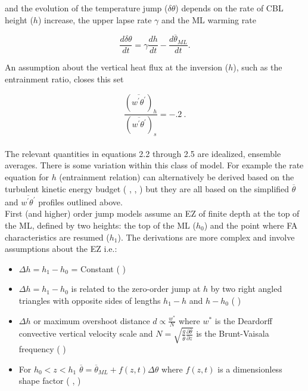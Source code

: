 and the evolution of the temperature jump ($\delta \theta$) depends on the rate of \acs{CBL} height ($h$) increase, the upper lapse rate $\gamma$ and the \acs{ML} warming rate
  
\begin{equation}
\frac{d\delta \theta}{dt} = \gamma\frac{dh}{dt} - \frac{d\overline{\theta}_{ML}}{dt}.
\end{equation}

An assumption about the vertical heat flux at the inversion ($h$), such as the entrainment ratio, closes this set

\begin{equation}
\frac{(\overline{w^{'}\theta^{'}})_{h}}{(\overline{w^{'}\theta^{'}})_{s}} = -.2 \ .
\end{equation}\\

The relevant quantities in equations 2.2 through 2.5 are idealized, ensemble averages. There is some variation within this class of model.  For example the rate equation for $h$ (entrainment relation) can alternatively be derived based on the turbulent kinetic energy budget (\citeauthor{FedConzMir04} \citeyear{FedConzMir04}, \citeauthor{Stull76a} \citeyear{Stull76a}, \citeauthor{Stull76b} \citeyear{Stull76b}) but they are all based on the simplified $\overline{\theta}$ and $\overline{w^{'}\theta^{'}}$ profiles outlined above.\\  

First (and higher) order jump models assume an \acs{EZ} of finite depth at the top of the ML, defined by two heights:  the top of the ML ($h_{0}$) and the point where \acs{FA} characteristics are resumed ($h_{1}$).  The derivations are more complex and involve assumptions about the \acs{EZ} i.e.: 

\begin{itemize}
\item{$\Delta h = h_{1} - h_{0}$ = Constant (\citeauthor{Betts74} \citeyear{Betts74})}

\item{$\Delta h = h_{1} - h_{0}$ is related to the zero-order jump at $h$ by two right angled triangles with opposite sides
of lengths $h_{1} - h$ and $h - h_{0}$ (\citeauthor{BatchGryn} \citeyear{BatchGryn})}

\item{$\Delta h$ or maximum overshoot distance $d \propto \frac{w^{*}}{N}$ where $w^{*}$ is the Deardorff convective vertical velocity scale and $N = \sqrt{\frac{g}{\overline{\theta}} \frac{\partial \overline{\theta}}{\partial z}}$ is the Brunt-Vaisala frequency (\citeauthor{Stull73} \citeyear{Stull73})}
 
\item{For $h_{0}<z<h_{1}$ $\overline{\theta} = \overline{\theta}_{ML} + f(z,t) \Delta \theta$ where $f(z,t)$ is a dimensionless shape factor (\citeauthor{Deardorff79} \citeyear{Deardorff79}, \citeauthor{FedConzMir04} \citeyear{FedConzMir04})}
\end{itemize}
 \\

